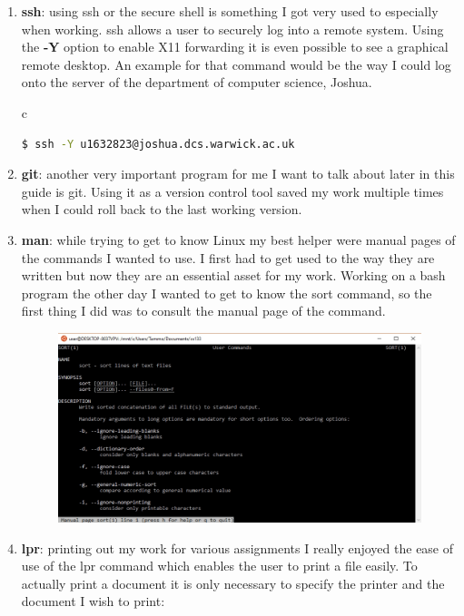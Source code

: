 \documentclass[12pt,a4paper]{article}
\begin{document}
\begin{enumerate}
\item \textbf{ssh}: using ssh or the secure shell is something I got very used to especially when working. ssh allows a user to securely log into a remote system. Using the \textbf{-Y} option to enable X11 forwarding it is even possible to see a graphical remote desktop. An example for that command would be the way I could log onto the server of the department of computer science, Joshua. 
\begin{center}
\begin{tabular}{c}
\begin{lstlisting}[language=bash]
  $ ssh -Y u1632823@joshua.dcs.warwick.ac.uk
\end{lstlisting}
\end{tabular}
\end{center}
\item \textbf{git}: another very important program for me I want to talk about later in this guide is git. Using it as a version control tool saved my work multiple times when I could roll back to the last working version.
\item \textbf{man}: while trying to get to know Linux my best helper were manual pages of the commands I wanted to use. I first had to get used to the way they are written but now they are an essential asset for my work. Working on a bash program the other day I wanted to get to know the sort command, so the first thing I did was to consult the manual page of the command. 
\begin{figure}[h]
\begin{center}
\includegraphics[width=150mm]{./manual.jpg}
\label{SortManual}
\end{center}
\end{figure} 
\item \textbf{lpr}: printing out my work for various assignments I really enjoyed the ease of use of the lpr command which enables the user to print a file easily. To actually print a document it is only necessary to specify the printer and the document I wish to print: 

\end{enumerate}
\end{document}
